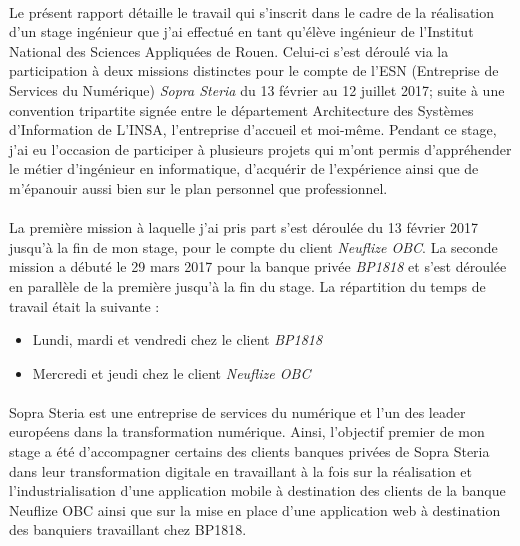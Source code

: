 \paragraph{}
Le présent rapport détaille le travail qui s’inscrit dans le cadre de la réalisation d’un stage ingénieur que j'ai effectué en tant qu'élève ingénieur de l’Institut National des Sciences Appliquées de Rouen. Celui-ci s’est déroulé via la participation à deux missions distinctes pour le compte de l'ESN (Entreprise de Services du Numérique) \textit{Sopra Steria} du 13 février au 12 juillet 2017; suite à une convention tripartite signée entre le département Architecture des Systèmes d’Information de L’INSA, l’entreprise d’accueil et moi-même. Pendant ce stage, j’ai eu l’occasion de participer à plusieurs projets qui m’ont permis d’appréhender le métier d’ingénieur en informatique, d’acquérir de l’expérience ainsi que de m’épanouir aussi bien sur le plan personnel que professionnel.

\paragraph{}
La première mission à laquelle j'ai pris part s'est déroulée du 13 février 2017 jusqu'à la fin de mon stage, pour le compte du client \textit{Neuflize OBC}. La seconde mission a débuté le 29 mars 2017 pour la banque privée \textit{BP1818} et s'est déroulée en parallèle de la première jusqu'à la fin du stage. La répartition du temps de travail était la suivante :
\begin{itemize}
	\item Lundi, mardi et vendredi chez le client \textit{BP1818}
	\item Mercredi et jeudi chez le client \textit{Neuflize OBC}
\end{itemize}

\paragraph{}
Sopra Steria est une entreprise de services du numérique et l'un des leader européens dans la transformation numérique. Ainsi, l'objectif premier de mon stage a été d'accompagner certains des clients banques privées de Sopra Steria dans leur transformation digitale en travaillant à la fois sur la réalisation et l'industrialisation d'une application mobile à destination des clients de la banque Neuflize OBC ainsi que sur la mise en place d'une application web à destination des banquiers travaillant chez BP1818.

